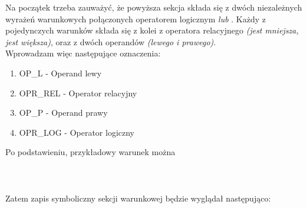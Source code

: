 Na początek trzeba zauważyć, że powyższa sekcja składa się z dwóch niezależnych wyrażeń warunkowych połączonych operatorem logicznym \textit{lub} . Każdy z pojedynczych warunków składa się z kolei z operatora relacyjnego \textit{(jest mniejsza, jest większa)}, oraz z dwóch operandów \textit{(lewego i prawego)}.
\\
Wprowadzam więc następujące oznaczenia:
\begin{enumerate}
	\item OP\_L - Operand lewy
	\item OPR\_REL - Operator relacyjny
	\item OP\_P - Operand prawy
	\item OPR\_LOG - Operator logiczny
\end{enumerate}

Po podstawieniu, przykładowy warunek można  
\\ \\
\\ \\
Zatem zapis symboliczny sekcji warunkowej będzie wyglądał następująco:
\\ \\
\\ \\

